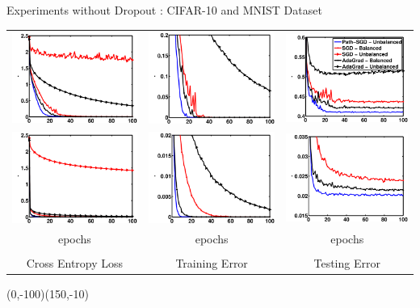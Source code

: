 \documentclass[presentation,xcolor={usenames,dvipsnames},10pt]{beamer}
\begin{document}
\begin{frame}{Experiments without Dropout : CIFAR-10 and MNIST Dataset}
	\centering
	\begin{tabular}{ccc}
		\includegraphics[width=0.33\linewidth]{cifar10-surr.pdf} &
		\includegraphics[width=0.33\linewidth]{cifar10-train.pdf} &
		\includegraphics[width=0.33\linewidth]{cifar10-test.pdf} \\
		\includegraphics[width=0.33\linewidth]{mnist-surr.pdf} &
		\includegraphics[width=0.33\linewidth]{mnist-train.pdf} &
		\includegraphics[width=0.33\linewidth]{mnist-test.pdf} \\
		\scriptsize epochs & \scriptsize epochs & \scriptsize epochs \\
		& & \\ 
		Cross Entropy Loss & Training Error & Testing Error
	\end{tabular}
	\begin{picture}(0,-100)(150,-10)
	\end{picture}
\end{frame}
\end{document}
